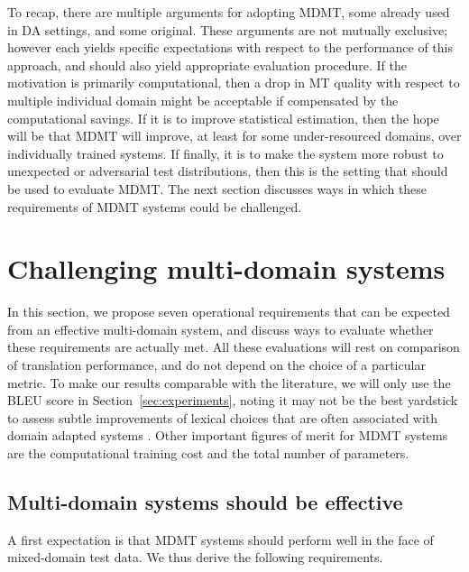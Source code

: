 \documentclass[11pt,a4paper]{article}
\newcommand{\fyDone}[1]{\done[FY]\Todo[FY:]{\textcolor{orange}{#1}}}
\begin{document}
\fyDone{recap}
To recap, there are multiple arguments for adopting MDMT, some already used in DA settings, and some original. These arguments are not mutually exclusive; however each yields specific expectations with respect to the performance of this approach, and should also yield appropriate evaluation procedure. If the motivation is primarily computational, then a drop in MT quality with respect to multiple individual domain might be acceptable if compensated by the computational savings. If it is to improve statistical estimation, then the hope will be that MDMT will improve, at least for some under-resourced domains, over individually trained systems. If finally, it is to make the system more robust to unexpected or adversarial test distributions, then this is the setting that should be used to evaluate MDMT. The next section discusses ways in which these requirements of MDMT systems could be challenged. 

\section{Challenging multi-domain systems \label{sec:challenging}}
In this section, we propose seven\fyDone{check number} operational requirements that can be expected from an effective multi-domain system, and discuss ways to evaluate whether these requirements are actually met. All these evaluations will rest on comparison of translation performance, and do not depend on the choice of a particular metric. To make our results comparable with the literature, we will only use the BLEU score \cite{Papineni02bleu} in Section~\ref{sec:experiments}, noting it may not be the best yardstick to assess subtle improvements of lexical choices that are often associated with domain adapted systems \cite{Irvine13measuring}. Other important figures of merit for MDMT systems are the computational training cost and the total number of parameters.\fyDone{Insert discussion about scores}

\subsection{Multi-domain systems should be effective \label{ssec:effective}}
A first expectation is that MDMT systems should perform well in the face of mixed-domain test data. We thus derive the following requirements.
\end{document}
